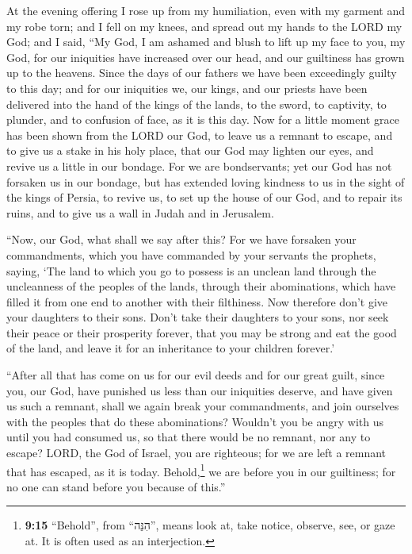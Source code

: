  At the evening offering I rose up from my humiliation,
even with my garment and my robe torn; and I fell on my knees, and
spread out my hands to the LORD my God;  and I said, ``My
God, I am ashamed and blush to lift up my face to you, my God, for our
iniquities have increased over our head, and our guiltiness has grown up
to the heavens.  Since the days of our fathers we have
been exceedingly guilty to this day; and for our iniquities we, our
kings, and our priests have been delivered into the hand of the kings of
the lands, to the sword, to captivity, to plunder, and to confusion of
face, as it is this day.  Now for a little moment grace
has been shown from the LORD our God, to leave us a remnant to escape,
and to give us a stake in his holy place, that our God may lighten our
eyes, and revive us a little in our bondage.  For we are
bondservants; yet our God has not forsaken us in our bondage, but has
extended loving kindness to us in the sight of the kings of Persia, to
revive us, to set up the house of our God, and to repair its ruins, and
to give us a wall in Judah and in Jerusalem.

 ``Now, our God, what shall we say after this? For we
have forsaken your commandments,  which you have
commanded by your servants the prophets, saying, `The land to which you
go to possess is an unclean land through the uncleanness of the peoples
of the lands, through their abominations, which have filled it from one
end to another with their filthiness.  Now therefore
don't give your daughters to their sons. Don't take their daughters to
your sons, nor seek their peace or their prosperity forever, that you
may be strong and eat the good of the land, and leave it for an
inheritance to your children forever.'

 ``After all that has come on us for our evil deeds and
for our great guilt, since you, our God, have punished us less than our
iniquities deserve, and have given us such a remnant, 
shall we again break your commandments, and join ourselves with the
peoples that do these abominations? Wouldn't you be angry with us until
you had consumed us, so that there would be no remnant, nor any to
escape?  LORD, the God of Israel, you are righteous; for
we are left a remnant that has escaped, as it is today.
Behold,\footnote{\textbf{9:15} ``Behold'', from ``הִנֵּה'', means look
  at, take notice, observe, see, or gaze at. It is often used as an
  interjection.} we are before you in our guiltiness; for no one can
stand before you because of this.''

